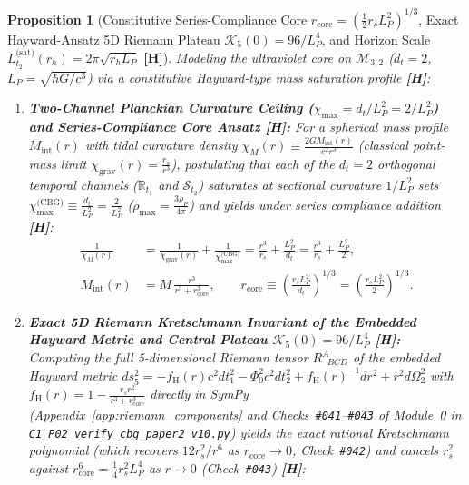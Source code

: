 \documentclass[11pt,a4paper]{article}
\newcommand{\catH}{\textbf{\textcolor{orange!85!black}{[H]}}}
\theoremstyle{plain}
\newtheorem{proposition}[theorem]{Proposition}
\theoremstyle{definition}
\theoremstyle{remark}
\numberwithin{equation}{section}
\begin{document}
\begin{proposition}[Constitutive Series-Compliance Core $r_{\text{core}} = (\frac{1}{2}r_s L_P^2)^{1/3}$, Exact Hayward-Ansatz 5D Riemann Plateau $\mathcal{K}_5(0) = 96/L_P^4$, and Horizon Scale $L_{t_2}^{\text{(sat)}}(r_h) = 2\pi\sqrt{r_h L_P}$ \catH]
\label{prop:planck_core_deduction}
Modeling the ultraviolet core on $\mathcal{M}_{3,2}$ ($d_t = 2$, $L_P = \sqrt{\hbar G/c^3}$) via a constitutive Hayward-type mass saturation profile \catH:
\begin{enumerate}
  \item[\textnormal{(i)}] \textbf{Two-Channel Planckian Curvature Ceiling ($\chi_{\max} = d_t/L_P^2 = 2/L_P^2$) and Series-Compliance Core Ansatz \catH:} For a spherical mass profile $M_{\text{int}}(r)$ with tidal curvature density $\chi_M(r) \equiv \frac{2GM_{\text{int}}(r)}{c^2 r^3}$ (classical point-mass limit $\chi_{\text{grav}}(r) = \frac{r_s}{r^3}$), postulating that each of the $d_t = 2$ orthogonal temporal channels ($\mathbb{R}_{t_1}$ and $\mathcal{S}_{t_2}$) saturates at sectional curvature $1/L_P^2$ sets $\chi_{\max}^{\text{(CBG)}} \equiv \frac{d_t}{L_P^2} = \frac{2}{L_P^2}$ ($\rho_{\max} = \frac{3\rho_P}{4\pi}$) and yields under series compliance addition \catH:
  \begin{align}
    \frac{1}{\chi_M(r)} &= \frac{1}{\chi_{\text{grav}}(r)} + \frac{1}{\chi_{\max}^{\text{(CBG)}}} = \frac{r^3}{r_s} + \frac{L_P^2}{d_t} = \frac{r^3}{r_s} + \frac{L_P^2}{2}, \nonumber \\[3pt]
    M_{\text{int}}(r) &= M\,\frac{r^3}{r^3 + r_{\text{core}}^3}, \qquad \boxed{r_{\text{core}} \equiv \left(\frac{r_s L_P^2}{d_t}\right)^{\!1/3} = \left(\frac{r_s L_P^2}{2}\right)^{\!1/3}.}
    \label{eq:regularized_interior_mass}
  \end{align}
  \item[\textnormal{(ii)}] \textbf{Exact 5D Riemann Kretschmann Invariant of the Embedded Hayward Metric and Central Plateau $\mathcal{K}_5(0) = 96/L_P^4$ \catH:} Computing the full 5-dimensional Riemann tensor $R^{A}_{\;\;BCD}$ of the embedded Hayward metric $ds_5^2 = -f_{\text{H}}(r)c^2 dt_1^2 - \Phi_0^2 c^2 dt_2^2 + f_{\text{H}}(r)^{-1}dr^2 + r^2 d\Omega_2^2$ with $f_{\text{H}}(r) = 1 - \frac{r_s r^2}{r^3 + r_{\text{core}}^3}$ directly in SymPy (Appendix~\ref{app:riemann_components} and Checks~\texttt{\#041}--\texttt{\#043} of Module~0 in \allowbreak\texttt{C1\_P02\_verify\_cbg\_paper2\_v10.py}) yields the exact rational Kretschmann polynomial (which recovers $12 r_s^2/r^6$ as $r_{\text{core}} \to 0$, Check~\texttt{\#042}) and cancels $r_s^2$ against $r_{\text{core}}^6 = \frac{1}{4}r_s^2 L_P^4$ as $r \to 0$ (Check~\texttt{\#043}) \catH:

\end{enumerate}
\end{proposition}
\end{document}
